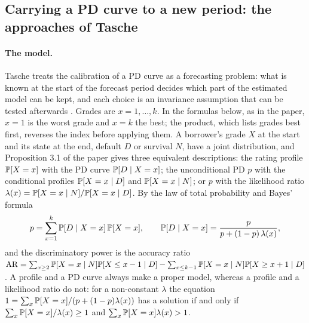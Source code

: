 \subsection{Carrying a PD curve to a new period: the approaches of Tasche}
\label{sec:m36}

\paragraph{The model.} Tasche treats the calibration of a PD curve as a forecasting problem: what is known at the start of the forecast period decides which part of the estimated model can be kept, and each choice is an invariance assumption that can be tested afterwards \citep{ratings:tasche2013}. Grades are $x=1,\dots,k$. In the formulas below, as in the paper, $x=1$ is the worst grade and $x=k$ the best; the product, which lists grades best first, reverses the index before applying them. A borrower's grade $X$ at the start and its state at the end, default $D$ or survival $N$, have a joint distribution, and Proposition 3.1 of the paper gives three equivalent descriptions: the rating profile $\mathbb{P}[X=x]$ with the PD curve $\mathbb{P}[D\mid X=x]$; the unconditional PD $p$ with the conditional profiles $\mathbb{P}[X=x\mid D]$ and $\mathbb{P}[X=x\mid N]$; or $p$ with the likelihood ratio $\lambda(x)=\mathbb{P}[X=x\mid N]/\mathbb{P}[X=x\mid D]$. By the law of total probability and Bayes' formula
\begin{equation}
p=\sum_{x=1}^{k}\mathbb{P}[D\mid X=x]\,\mathbb{P}[X=x],\qquad
\mathbb{P}[D\mid X=x]=\frac{p}{p+(1-p)\,\lambda(x)},
\label{eq:ratings-bayes}
\end{equation}
and the discriminatory power is the accuracy ratio $\mathrm{AR}=\sum_{x\ge2}\mathbb{P}[X=x\mid N]\mathbb{P}[X\le x-1\mid D]-\sum_{x\le k-1}\mathbb{P}[X=x\mid N]\mathbb{P}[X\ge x+1\mid D]$. A profile and a PD curve always make a proper model, whereas a profile and a likelihood ratio do not: for a non-constant $\lambda$ the equation $1=\sum_x\mathbb{P}[X=x]/(p+(1-p)\lambda(x))$ has a solution if and only if $\sum_x\mathbb{P}[X=x]/\lambda(x)\ge1$ and $\sum_x\mathbb{P}[X=x]\lambda(x)>1$.


